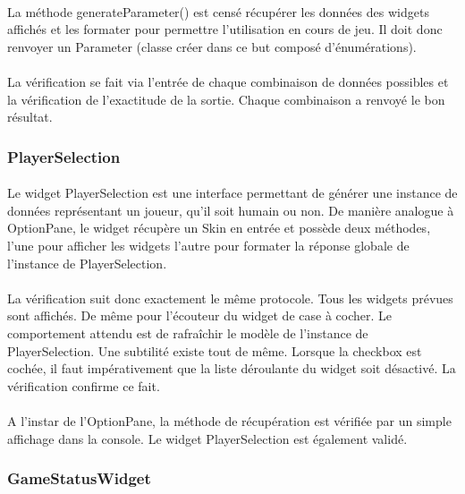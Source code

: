 \documentclass[11pt]{article} %
\begin{document}
\paragraph{}
La méthode generateParameter() est censé récupérer les données des widgets affichés et les formater pour permettre l'utilisation en cours de jeu. Il doit donc renvoyer un Parameter (classe créer dans ce but composé d'énumérations). 
\paragraph{}
La vérification se fait via l'entrée de chaque combinaison de données possibles et la vérification de l'exactitude de la sortie. Chaque combinaison a renvoyé le bon résultat. 

\subsubsection{PlayerSelection}
\paragraph{}
Le widget PlayerSelection est une interface permettant de générer une instance de données représentant un joueur, qu'il soit humain ou non. De manière analogue à OptionPane, le widget récupère un Skin en entrée et possède deux méthodes, l'une pour afficher les widgets l'autre pour formater la réponse globale de l'instance de PlayerSelection.
\paragraph{}
La vérification suit donc exactement le même protocole. Tous les widgets prévues sont affichés. De même pour l'écouteur du widget de case à cocher. Le comportement attendu est de rafraîchir le modèle de l'instance de PlayerSelection. Une subtilité existe tout de même. Lorsque la checkbox est cochée, il faut impérativement que la liste déroulante du widget soit désactivé. La vérification confirme ce fait.
\paragraph{}
A l'instar de l'OptionPane, la méthode de récupération est vérifiée par un simple affichage dans la console. Le widget PlayerSelection est également validé.

\subsubsection{GameStatusWidget}
\end{document}
